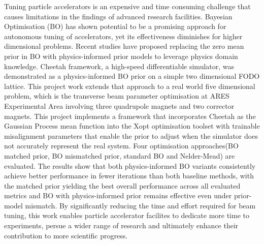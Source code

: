 Tuning particle accelerators is an expensive and time consuming challenge that causes limitations in the findings of advanced research facilities. 
Bayesian Optimisation (BO) has shown potential to be a promising approach for autonomous tuning of accelerators, yet its effectiveness diminishes 
for higher dimensional problems. Recent studies have proposed replacing the zero mean prior in BO with physics-informed prior models to leverage physics 
domain knowledge. Cheetah framework, a high-speed differentiable simulator, was demonstrated as a physics-informed BO prior on a simple two dimensional 
FODO lattice. This project work extends that approach to a real world five dimensional problem, which is the transverse beam parameter optimisation 
at ARES Experimental Area involving three quadrupole magnets and two corrector magnets. This project implements a framework that incorporates Cheetah as the Gaussian 
Process mean function into the Xopt optimisation toolset with trainable misalignment parameters that enable the prior to adjust when the simulator does not accurately 
represent the real system. Four optimisation approaches(BO matched prior, BO mismatched prior, standard BO and Nelder-Mead) are evaluated. The results show
that both physics-informed BO variants consistently achieve better performance in fewer iterations than both baseline methods, with
the matched prior yielding the best overall performance across all evaluated metrics and 
BO with physics-informed prior remains effective even under prior-model mismatch. By significantly reducing the time and effort
required for beam tuning, this work enables particle accelerator facilites to dedicate more time to experiments, persue a wider range of research and ultimately enhance their contribution to 
more scientific progress.
